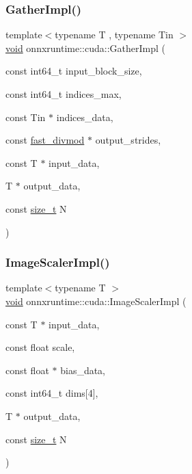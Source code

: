 \subsubsection{\texorpdfstring{Gather\+Impl()}{GatherImpl()}}
{\footnotesize\ttfamily template$<$typename T , typename Tin $>$ \\
\mbox{\hyperlink{mlasi_8h_a88f941d423cb2a819b70a1358982b1a6}{void}} onnxruntime\+::cuda\+::\+Gather\+Impl (\begin{DoxyParamCaption}\item[{const int64\+\_\+t}]{input\+\_\+block\+\_\+size,  }\item[{const int64\+\_\+t}]{indices\+\_\+max,  }\item[{const Tin $\ast$}]{indices\+\_\+data,  }\item[{const \mbox{\hyperlink{classonnxruntime_1_1cuda_1_1fast__divmod}{fast\+\_\+divmod}} $\ast$}]{output\+\_\+strides,  }\item[{const T $\ast$}]{input\+\_\+data,  }\item[{T $\ast$}]{output\+\_\+data,  }\item[{const \mbox{\hyperlink{mlasi_8h_a503efbc1c6e50825320ad909366b78ab}{size\+\_\+t}}}]{N }\end{DoxyParamCaption})}

\mbox{\label{namespaceonnxruntime_1_1cuda_a57b6bca9b2d68ad8f4a8eb1e0d8cca75}} 
\subsubsection{\texorpdfstring{Image\+Scaler\+Impl()}{ImageScalerImpl()}}
{\footnotesize\ttfamily template$<$typename T $>$ \\
\mbox{\hyperlink{mlasi_8h_a88f941d423cb2a819b70a1358982b1a6}{void}} onnxruntime\+::cuda\+::\+Image\+Scaler\+Impl (\begin{DoxyParamCaption}\item[{const T $\ast$}]{input\+\_\+data,  }\item[{const float}]{scale,  }\item[{const float $\ast$}]{bias\+\_\+data,  }\item[{const int64\+\_\+t}]{dims\mbox{[}4\mbox{]},  }\item[{T $\ast$}]{output\+\_\+data,  }\item[{const \mbox{\hyperlink{mlasi_8h_a503efbc1c6e50825320ad909366b78ab}{size\+\_\+t}}}]{N }\end{DoxyParamCaption})}

